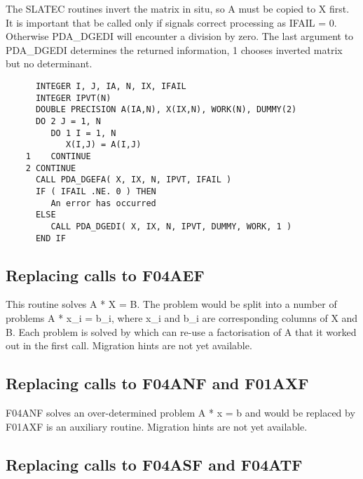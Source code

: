    The SLATEC routines invert the matrix in situ, so A must be copied to
   X first. It is important that
   be called only if
   signals
   correct processing as IFAIL = 0. Otherwise PDA\_DGEDI will encounter a
   division by zero. The last argument to PDA\_DGEDI
   determines the returned information, 1 chooses inverted matrix but no
   determinant.

\begin{verbatim}
      INTEGER I, J, IA, N, IX, IFAIL
      INTEGER IPVT(N)
      DOUBLE PRECISION A(IA,N), X(IX,N), WORK(N), DUMMY(2)
      DO 2 J = 1, N
         DO 1 I = 1, N
            X(I,J) = A(I,J)
    1    CONTINUE
    2 CONTINUE
      CALL PDA_DGEFA( X, IX, N, IPVT, IFAIL )
      IF ( IFAIL .NE. 0 ) THEN
         An error has occurred
      ELSE
         CALL PDA_DGEDI( X, IX, N, IPVT, DUMMY, WORK, 1 )
      END IF
\end{verbatim}


\subsection{Replacing calls to F04AEF}

   This routine solves A * X = B. The problem would be split into a
   number of problems A * x\_i = b\_i, where x\_i and b\_i are
   corresponding columns of X and B. Each problem is solved by
   which can re-use a factorisation of A that it worked out in the first
   call.
   Migration hints are not yet available.


\subsection{Replacing calls to F04ANF and F01AXF}

   F04ANF solves an over-determined problem A * x = b and would be
   replaced by
   F01AXF is an auxiliary routine.
   Migration hints are not yet available.


\subsection{Replacing calls to F04ASF and F04ATF}

